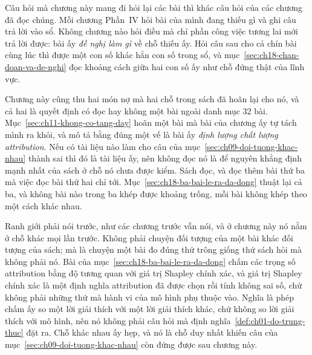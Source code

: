 %
Câu hỏi mà chương này mang đi hỏi lại các bài thì khác câu hỏi của các chương đã
đọc chúng. Mỗi chương Phần~IV hỏi bài của mình đang thiếu gì và ghi câu trả lời
vào sổ. Không chương nào hỏi điều mà chỉ phần công việc tương lai mới trả lời
được: bài ấy \emph{đề nghị làm gì} về chỗ thiếu ấy. Hỏi câu sau cho cả chín bài
cùng lúc thì được một con số khác hẳn con số trong sổ, và
mục~\ref{sec:ch18-chan-doan-va-de-nghi} đọc khoảng cách giữa hai con số ấy như
chỗ đứng thật của lĩnh vực.

%
Chương này cũng thu hai món nợ mà hai chỗ trong sách đã hoãn lại cho nó, và cả
hai là quyết định có đọc hay không một bài ngoài danh mục 32 bài.
Mục~\ref{sec:ch11-khong-co-tang-day} hoãn một bài mà bài của chương ấy tự tách
mình ra khỏi, và mô tả bằng đúng một vế là bài ấy \emph{định lượng chất lượng
attribution}. Nếu có tài liệu nào làm cho câu của
mục~\ref{sec:ch09-doi-tuong-khac-nhau} thành sai thì đó là tài liệu ấy, nên
không đọc nó là để nguyên khẳng định mạnh nhất của sách ở chỗ nó chưa được kiểm.
Sách đọc, và đọc thêm bài thứ ba mà việc đọc bài thứ hai chỉ tới.
Mục~\ref{sec:ch18-ba-bai-le-ra-da-dong} thuật lại cả ba, và không bài nào trong
ba khép được khoảng trống, mỗi bài không khép theo một cách khác nhau.

Ranh giới phải nói trước, như các chương trước vẫn nói, và ở chương này nó nằm ở
chỗ khác mọi lần trước. Không phải chuyện đối tượng của một bài khác đối tượng
của sách; mà là chuyện một bài đo đúng thứ trông giống thứ sách hỏi mà không phải
nó. Bài của mục~\ref{sec:ch18-ba-bai-le-ra-da-dong} chấm các trọng số attribution
bằng độ tương quan với giá trị Shapley chính xác, và giá trị Shapley chính xác là
một định nghĩa attribution đã được chọn rồi tính không sai số, chứ không phải
những thứ mà hành vi của mô hình phụ thuộc vào. Nghĩa là phép chấm ấy so một lời
giải thích với một lời giải thích khác, chứ không so lời giải thích với mô hình,
nên nó không phải câu hỏi mà định nghĩa~\ref{def:ch01-do-trung-thuc} đặt ra. Chỗ
khác nhau ấy hẹp, và nó là chỗ duy nhất khiến câu của
mục~\ref{sec:ch09-doi-tuong-khac-nhau} còn đứng được sau chương này.









